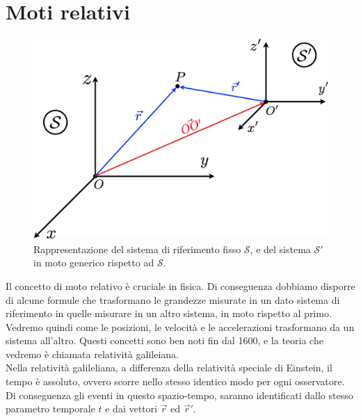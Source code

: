 \chapter{Moti relativi}
\begin{figure}[htbp]
\center
    \includegraphics[width=13cm]{images/relativemotions.png}
    \caption{Rappresentazione del sistema di riferimento fisso $\mathcal{S}$,
    e del sistema  $\mathcal{S'}$ in moto generico rispetto ad  $\mathcal{S}$.}
\label{fig:RelativeMotions}
\end{figure}
Il concetto di moto relativo è cruciale in fisica. Di conseguenza dobbiamo
disporre di alcune formule che trasformano le grandezze misurate in un dato
sistema di riferimento in quelle misurare in un altro sistema, in moto
rispetto al primo.\\
Vedremo quindi come le posizioni, le velocità e le accelerazioni trasformano
da un sistema all'altro. Questi concetti sono ben noti fin dal 1600, e la
teoria che vedremo è chiamata relatività galileiana.\\
Nella relatività galileliana, a differenza della relatività speciale di
Einstein, il tempo è assoluto, ovvero scorre nello stesso identico modo per
ogni osservatore.
Di conseguenza gli eventi in questo spazio-tempo, saranno identificati dallo
stesso parametro temporale $t$ e dai vettori $\vec r$ ed $\vec r'$.





